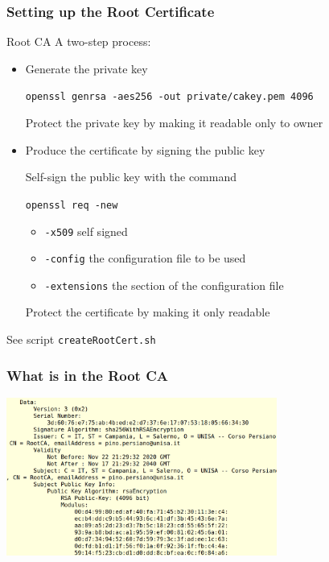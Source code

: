 \documentclass[]{beamer}
\begin{document}
\begin{frame}
\frametitle{Setting up the Root Certificate}

\begin{block}{Root CA}
A two-step process:
\begin{itemize}
\item Generate the private key

    {\color{brown} \tt openssl genrsa -aes256 -out private/cakey.pem 4096}

    {\color{red} Protect the private key by making it readable only to owner}

\item Produce the certificate by signing the public key

    Self-sign the public key with the command

    {\color{brown} \tt openssl req -new}
    \begin{itemize}
        \item {\tt -x509} self signed
        \item {\tt -config} the configuration file to be used
        \item {\tt -extensions} the section of the configuration file 
    \end{itemize}
    {\color{red} Protect the certificate by making it only readable }


\end{itemize}
\end{block}

See script {\tt createRootCert.sh}
\end{frame}

\begin{frame}
\frametitle{What is in the Root CA}
\begin{center}
\includegraphics[width=3.5in]{imgs/rootCert.png}
\end{center}
\end{frame}
\end{document}
